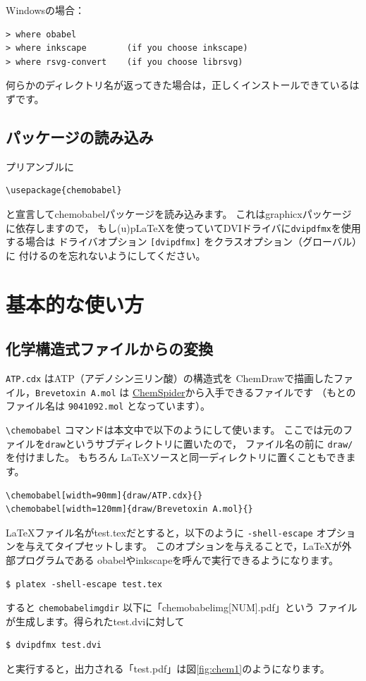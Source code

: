 \documentclass[12pt]{ltjsarticle}
\begin{document}
Windowsの場合：
\begin{verbatim}
> where obabel
> where inkscape        (if you choose inkscape)
> where rsvg-convert    (if you choose librsvg)
\end{verbatim}

何らかのディレクトリ名が返ってきた場合は，正しくインストールできているはずです。

\subsection{パッケージの読み込み}

プリアンブルに
\begin{verbatim}
\usepackage{chemobabel}
\end{verbatim}
と宣言して\textsf{chemobabel}パッケージを読み込みます。
これは\textsf{graphicx}パッケージに依存しますので，
もし(u)p\LaTeX を使っていてDVIドライバに\texttt{dvipdfmx}を使用する場合は
ドライバオプション \verb+[dvipdfmx]+ をクラスオプション（グローバル）に
付けるのを忘れないようにしてください。

\clearpage

\section{基本的な使い方}
\label{basic}

\subsection{化学構造式ファイルからの変換}

\verb|ATP.cdx| はATP（アデノシン三リン酸）の構造式を
ChemDrawで描画したファイル，\verb|Brevetoxin A.mol| は
\href{http://www.chemspider.com/}{ChemSpider}から入手できるファイルです
（もとのファイル名は \verb|9041092.mol| となっています）。

\verb|\chemobabel| コマンドは本文中で以下のようにして使います。
ここでは元のファイルを\texttt{draw}というサブディレクトリに置いたので，
ファイル名の前に \texttt{draw/} を付けました。
もちろん \LaTeX ソースと同一ディレクトリに置くこともできます。

\begin{verbatim}
\chemobabel[width=90mm]{draw/ATP.cdx}{}
\chemobabel[width=120mm]{draw/Brevetoxin A.mol}{}
\end{verbatim}

\LaTeX ファイル名がtest.texだとすると，以下のように
\verb|-shell-escape| オプションを与えてタイプセットします。
このオプションを与えることで，\LaTeX が外部プログラムである
obabelやinkscapeを呼んで実行できるようになります。
\begin{verbatim}
$ platex -shell-escape test.tex
\end{verbatim}
すると \verb|chemobabelimgdir| 以下に「chemobabelimg[NUM].pdf」という
ファイルが生成します。得られたtest.dviに対して
\begin{verbatim}
$ dvipdfmx test.dvi
\end{verbatim}
と実行すると，出力される「test.pdf」は図\ref{fig:chem1}のようになります。
\end{document}
